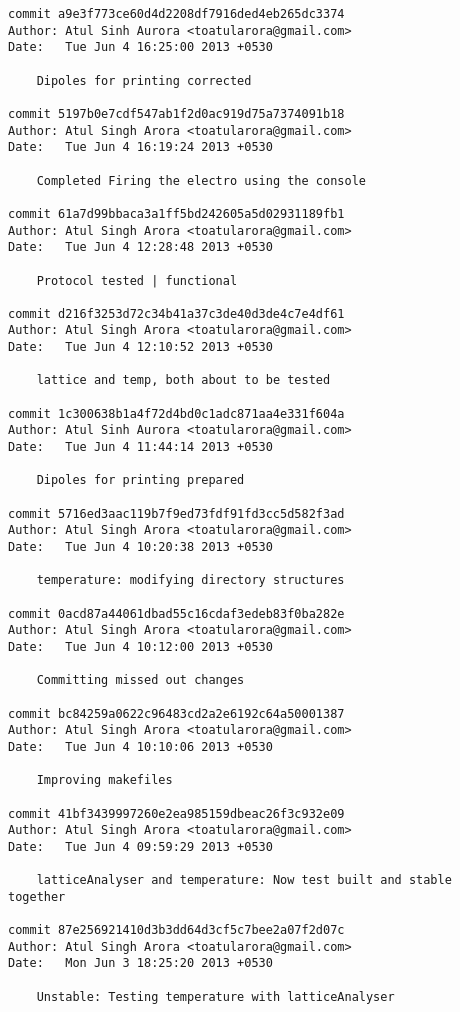 \begin{lstlisting}
commit a9e3f773ce60d4d2208df7916ded4eb265dc3374
Author: Atul Sinh Aurora <toatularora@gmail.com>
Date:   Tue Jun 4 16:25:00 2013 +0530

    Dipoles for printing corrected

commit 5197b0e7cdf547ab1f2d0ac919d75a7374091b18
Author: Atul Singh Arora <toatularora@gmail.com>
Date:   Tue Jun 4 16:19:24 2013 +0530

    Completed Firing the electro using the console

commit 61a7d99bbaca3a1ff5bd242605a5d02931189fb1
Author: Atul Singh Arora <toatularora@gmail.com>
Date:   Tue Jun 4 12:28:48 2013 +0530

    Protocol tested | functional

commit d216f3253d72c34b41a37c3de40d3de4c7e4df61
Author: Atul Singh Arora <toatularora@gmail.com>
Date:   Tue Jun 4 12:10:52 2013 +0530

    lattice and temp, both about to be tested

commit 1c300638b1a4f72d4bd0c1adc871aa4e331f604a
Author: Atul Sinh Aurora <toatularora@gmail.com>
Date:   Tue Jun 4 11:44:14 2013 +0530

    Dipoles for printing prepared

commit 5716ed3aac119b7f9ed73fdf91fd3cc5d582f3ad
Author: Atul Singh Arora <toatularora@gmail.com>
Date:   Tue Jun 4 10:20:38 2013 +0530

    temperature: modifying directory structures

commit 0acd87a44061dbad55c16cdaf3edeb83f0ba282e
Author: Atul Singh Arora <toatularora@gmail.com>
Date:   Tue Jun 4 10:12:00 2013 +0530

    Committing missed out changes

commit bc84259a0622c96483cd2a2e6192c64a50001387
Author: Atul Singh Arora <toatularora@gmail.com>
Date:   Tue Jun 4 10:10:06 2013 +0530

    Improving makefiles

commit 41bf3439997260e2ea985159dbeac26f3c932e09
Author: Atul Singh Arora <toatularora@gmail.com>
Date:   Tue Jun 4 09:59:29 2013 +0530

    latticeAnalyser and temperature: Now test built and stable together

commit 87e256921410d3b3dd64d3cf5c7bee2a07f2d07c
Author: Atul Singh Arora <toatularora@gmail.com>
Date:   Mon Jun 3 18:25:20 2013 +0530

    Unstable: Testing temperature with latticeAnalyser


\end{lstlisting}
